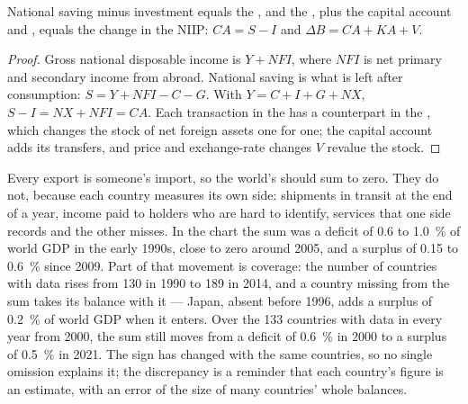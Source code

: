 \begin{proposition}\label{prop:b3:current-account:identity}
National saving minus investment equals the , and the , plus the capital account and , equals the change in
the NIIP: $CA = S - I$ and $\Delta B = CA + KA + V$.
\end{proposition}

\begin{proof}
Gross national disposable income is $Y + NFI$, where $NFI$ is net primary and
secondary income from abroad. National saving is what is left after consumption:
$S = Y + NFI - C - G$. With $Y = C + I + G + NX$, $S - I = NX + NFI = CA$. Each
transaction in the  has a counterpart in the ,
which changes the stock of net foreign assets one for one; the capital account
adds its transfers, and price and exchange-rate changes $V$ revalue the stock.
\end{proof}

\begin{measure}
Every export is someone's import, so the world's  should sum to
zero. They do not, because each country measures its own side: shipments in transit
at the end of a year, income paid to holders who are hard to identify, services
that one side records and the other misses. In the chart the sum was a deficit of
0.6 to 1.0~\% of world GDP in the early 1990s, close to zero around 2005, and a
surplus of 0.15 to 0.6~\% since 2009. %
Part of that movement is coverage: the number of countries with data rises from
130 in 1990 to 189 in 2014, and a country missing from the sum takes its balance
with it --- Japan, absent before 1996, adds a surplus of 0.2~\% of world GDP when it
enters. Over the 133 countries with data in every year from 2000, the sum still
moves from a deficit of 0.6~\% in 2000 to a surplus of 0.5~\% in 2021.
The sign has changed with the same countries, so no single omission explains it; the discrepancy is a
reminder that each country's figure is an estimate, with an error of the size of
many countries' whole balances.
\end{measure}

